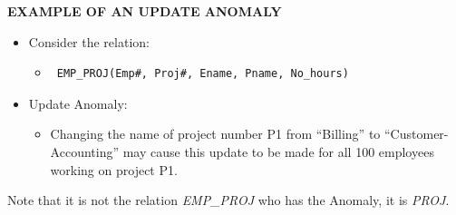 \textbf{EXAMPLE OF AN UPDATE ANOMALY}
\begin{itemize}
    \item Consider the relation:
    \begin{itemize}
        \item  \begin{verbatim} EMP_PROJ(Emp#, Proj#, Ename, Pname, No_hours) \end{verbatim}
    \end{itemize}
    \item Update Anomaly:
    \begin{itemize}
        \item Changing the name of project number P1 from
            “Billing” to “Customer-Accounting” may cause this
            update to be made for all 100 employees working
            on project P1.
    \end{itemize}
\end{itemize}
Note that it is not the relation \textit{EMP\_PROJ}
who has the Anomaly, it is \textit{PROJ}.

